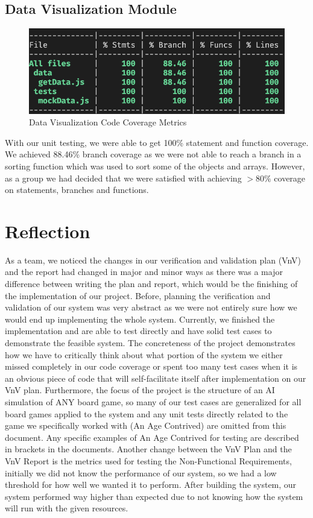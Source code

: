 \documentclass[12pt, titlepage]{article}
\begin{document}
\subsection{Data Visualization Module}
\begin{figure}[!ht]
    \centering
    \includegraphics[width=\textwidth]{DataVisualizationCoverage.png}
    \caption{Data Visualization Code Coverage Metrics}
    \label{Data Visualization Code Coverage Metrics}
\end{figure}
\label{Code Coverage Data Visualization}
With our unit testing, we were able to get 100\% statement and function coverage. We achieved 88.46\% branch coverage as we were not able to reach a branch in a sorting function which was used to sort some of the objects and arrays. However, as a group we had decided that we were satisfied with achieving $> 80\%$ coverage on statements, branches and functions. 

\newpage
\section{Reflection}
As a team, we noticed the changes in our verification and validation plan (VnV) and the report had changed in major and minor ways as there was a major difference between writing the plan and report, which would be the finishing of the implementation of our project. Before, planning the verification and validation of our system was very abstract as we were not entirely sure how we would end up implementing the whole system. Currently, we finished the implementation and are able to test directly and have solid test cases to demonstrate the feasible system. The concreteness of the project demonstrates how we have to critically think about what portion of the system we either missed completely in our code coverage or spent too many test cases when it is an obvious piece of code that will self-facilitate itself after implementation on our VnV plan. Furthermore, the focus of the project is the structure of an AI simulation of ANY board game, so many of our test cases are generalized for all board games applied to the system and any unit tests directly related to the game we specifically worked with (An Age Contrived) are omitted from this document. Any specific examples of An Age Contrived for testing are described in brackets in the documents. Another change between the VnV Plan and the VnV Report is the metrics used for testing the Non-Functional Requirements, initially we did not know the performance of our system, so we had a low threshold for how well we wanted it to perform. After building the system, our system performed way higher than expected due to not knowing how the system will run with the given resources. 
\end{document}
